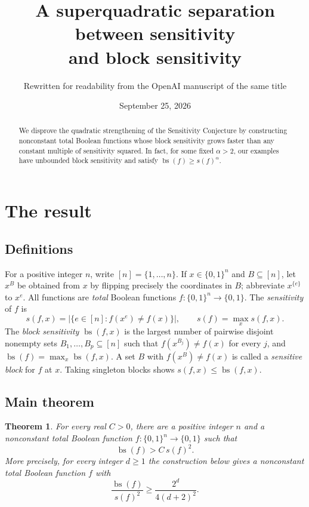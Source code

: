 \documentclass[11pt]{article}
\title{A superquadratic separation between sensitivity\\and block sensitivity}
\author{Rewritten for readability from the OpenAI manuscript of the same title}
\date{September 25, 2026}
\newcommand{\bs}{\operatorname{bs}}
\newtheorem{theorem}{Theorem}[section]
\theoremstyle{definition}
\theoremstyle{remark}
\begin{document}
\maketitle
\begin{abstract}
We disprove the quadratic strengthening of the Sensitivity Conjecture by
constructing nonconstant total Boolean functions whose block sensitivity grows
faster than any constant multiple of sensitivity squared. In fact, for some
fixed \(\alpha>2\), our examples have unbounded block sensitivity and satisfy
\(\bs(f)\ge s(f)^\alpha\).
\end{abstract}

\section{The result}
\label{sec:introduction}

\subsection{Definitions}
For a positive integer \(n\), write \([n]=\{1,\ldots,n\}\).
If \(x\in\{0,1\}^n\) and \(B\subseteq[n]\), let \(x^B\) be obtained from \(x\)
by flipping precisely the coordinates in \(B\); abbreviate \(x^{\{e\}}\) to
\(x^e\). All functions are \emph{total} Boolean functions
\(f:\{0,1\}^n\to\{0,1\}\). The \emph{sensitivity} of \(f\) is
\[
 s(f,x)=\bigl|\{e\in[n]:f(x^e)\ne f(x)\}\bigr|,
 \qquad s(f)=\max_x s(f,x).
\]
The \emph{block sensitivity} \(\bs(f,x)\) is the largest number of pairwise
disjoint nonempty sets \(B_1,\ldots,B_p\subseteq[n]\) such that
\(f(x^{B_j})\ne f(x)\) for every \(j\), and \(\bs(f)=\max_x\bs(f,x)\).
A set \(B\) with \(f(x^B)\ne f(x)\) is called a \emph{sensitive block} for \(f\)
at \(x\). Taking singleton blocks shows \(s(f,x)\le\bs(f,x)\).

\subsection{Main theorem}

\begin{theorem}\label{thm:main}
For every real \(C>0\), there are a positive integer \(n\) and a
nonconstant total Boolean function \(f:\{0,1\}^n\to\{0,1\}\) such that
\[
 \bs(f)>C\,s(f)^2.
\]
More precisely, for every integer \(d\ge1\) the construction below gives
a nonconstant total Boolean function \(f\) with
\[
 \frac{\bs(f)}{s(f)^2}\ge \frac{2^d}{4(d+2)^2}.
\]
\end{theorem}
\end{document}
